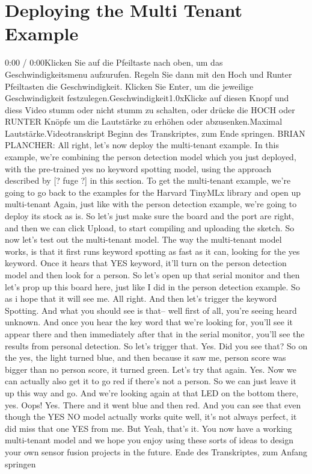 \section{Deploying the Multi Tenant Example}
0:00 / 0:00Klicken Sie auf die Pfeiltaste nach oben, um das Geschwindigkeitsmenu aufzurufen. Regeln Sie dann mit den Hoch und Runter Pfeiltasten die Geschwindigkeit. Klicken Sie Enter, um die jeweilige Geschwindigkeit festzulegen.Geschwindigkeit1.0xKlicke auf diesen Knopf und diess Video stumm oder nicht stumm zu schalten, oder drücke die HOCH oder RUNTER Knöpfe um die Lautstärke zu erhöhen oder abzusenken.Maximal Lautstärke.Videotranskript
Beginn des Transkriptes, zum Ende springen.
BRIAN PLANCHER: All right, let's now deploy the multi-tenant example.
In this example, we're combining the person detection model which you just
deployed, with the pre-trained yes no keyword spotting model,
using the approach described by [? fuge ?] in this section.
To get the multi-tenant example, we're going
to go back to the examples for the Harvard TinyMLx library
and open up multi-tenant Again, just like with the person detection example,
we're going to deploy its stock as is.
So let's just make sure the board and the port are right,
and then we can click Upload, to start compiling and uploading the sketch.
So now let's test out the multi-tenant model.
The way the multi-tenant model works, is that it first
runs keyword spotting as fast as it can, looking for the yes keyword.
Once it hears that YES keyword, it'll turn on the person detection model
and then look for a person.
So let's open up that serial monitor and then let's
prop up this board here, just like I did in the person detection example.
So as i hope that it will see me.
All right.
And then let's trigger the keyword Spotting.
And what you should see is that--
well first of all, you're seeing heard unknown.
And once you hear the key word that we're
looking for, you'll see it appear there and then immediately after that
in the serial monitor, you'll see the results from personal detection.
So let's trigger that.
Yes.
Did you see that?
So on the yes, the light turned blue, and then because it saw me,
person score was bigger than no person score, it turned green.
Let's try that again.
Yes.
Now we can actually also get it to go red if there's not a person.
So we can just leave it up this way and go.
And we're looking again at that LED on the bottom there, yes.
Oops!
Yes.
There and it went blue and then red.
And you can see that even though the YES NO model actually works quite well,
it's not always perfect, it did miss that one YES from me.
But Yeah, that's it.
You now have a working multi-tenant model
and we hope you enjoy using these sorts of ideas
to design your own sensor fusion projects in the future.
Ende des Transkriptes, zum Anfang springen

